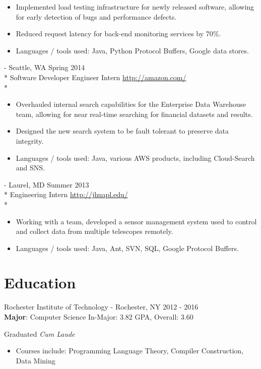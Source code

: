 \documentclass[a4paper,margin,line]{resume}
\newcommand{\rurl}[1]{\hfill {\footnotesize \url{#1}}}
\newcommand{\rdate}[1]{\hfill {\small #1}}
\renewcommand{\employer}[5]{ \item[#1] - #2 \rdate{#3} \\* #4 \rurl{#5} \\*}
\begin{document}
\begin{resume}
\begin{asparadesc}
\begin{itemize}
    \item Implemented load testing infrastructure for newly released software, allowing for early
      detection of bugs and performance defects.
    \item Reduced request latency for back-end monitoring services by 70\%.
    \item Languages / tools used: Java, Python Protocol Buffers, Google data stores.
    \end{itemize}
    \employer{Amazon}{Seattle, WA}{Spring 2014}{Software Developer Engineer
      Intern}{http://amazon.com/}
    \vspace{-5mm}
    \begin{itemize}
    \item Overhauled internal search capabilities for the Enterprise Data Warehouse team, allowing
      for near real-time searching for financial datasets and results.
    \item Designed the new search system to be fault tolerant to preserve data integrity.
    \item Languages / tools used: Java, various AWS products, including Cloud-Search and SNS.
    \end{itemize}
    \employer{John Hopkins University Applied Physics Lab}{Laurel, MD}{Summer 2013}{Engineering
      Intern}{http://jhuapl.edu/}
    \vspace{-5mm}
    \begin{itemize}
    \item Working with a team, developed a sensor management system used to control and collect data
      from multiple telescopes remotely.
    \item Languages / tools used: Java, Ant, SVN, SQL, Google Protocol Buffers.
    \end{itemize}
  \end{asparadesc}
  \section{\mysidestyle Education}
  \begin{compactdesc}
  \item[Rochester Institute of Technology] - Rochester, NY \hfill {2012 - 2016} \\
    \textbf{Major}: Computer Science \hfill {In-Major: 3.82 GPA, Overall: 3.60} \\
    \vspace{-4mm}
    \begin{flushright} Graduated \textit{Cum Laude} \end{flushright}
    \vspace{1mm}
    \begin{itemize}
    \item \small Courses include: Programming Language Theory, Compiler Construction, Data Mining
    \end{itemize}
  \end{compactdesc}
  \vspace{-2mm}

\end{resume}
\end{document}
